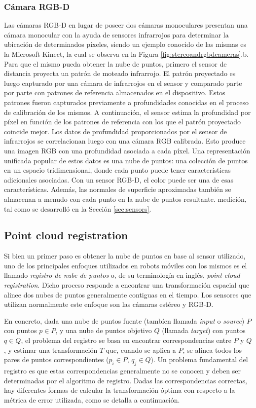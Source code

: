 \subsubsection{Cámara RGB-D}
Las cámaras RGB-D\cite{hogman2011} en lugar de poseer dos cámaras monoculares presentan una cámara monocular con la ayuda de sensores infrarrojos para determinar la ubicación de determinados píxeles, siendo un ejemplo conocido de las mismas es la Microsoft Kinect, la cual se observa en la Figura \ref{fig:stereoandrgbdcameras}.b. Para que el mismo pueda obtener la nube de puntos, primero el sensor de distancia proyecta un patrón de moteado infrarrojo. El patrón proyectado es luego capturado por una cámara de infrarrojos en el sensor y comparado parte por parte con patrones de referencia almacenados en el dispositivo. Estos patrones fueron capturados previamente a profundidades conocidas en el proceso de calibración de los mismos. A continuación, el sensor estima la profundidad por píxel en función de los patrones de referencia con los que el patrón proyectado coincide mejor. Los datos de profundidad proporcionados por el sensor de infrarrojos se correlacionan luego con una cámara RGB calibrada. Esto produce una imagen RGB con una profundidad asociada a cada píxel. Una representación unificada popular de estos datos es una nube de puntos: una colección de puntos en un espacio tridimensional, donde cada punto puede tener características adicionales asociadas. Con un sensor RGB-D, el color puede ser una de esas características. Además, las normales de superficie aproximadas también se almacenan a menudo con cada punto en la nube de puntos resultante.
\else
medición, tal como se desarrolló en la Sección \ref{sec:sensors}.
\fi
\subsection{Point cloud registration}
Si bien un primer paso es obtener la nube de puntos en base al sensor utilizado, uno de los principales enfoques utilizados en robots móviles con los mismos es el llamado \textit{registro de nube de puntos} o, de su terminología en inglés, \textit{point cloud registration}. Dicho proceso responde a encontrar una transformación espacial que alinee dos nubes de puntos generalmente contiguas en el tiempo. Los sensores que utilizan normalmente este enfoque son las cámaras estéreo y RGB-D.

En concreto, dada una nube de puntos fuente (tambíen llamada \textit{input} o \textit{source}) $P$ con puntos $p \in P$, y una nube de puntos objetivo $Q$ (llamada \textit{target}) con puntos $q \in Q$, el problema del registro se basa en encontrar correspondencias entre $P$ y $Q$, y estimar una transformación $T$ que, cuando se aplica a $P$, se alinea todos los pares de puntos correspondientes ($p_i \in P$, $q_j \in Q$). Un problema fundamental del registro es que estas correspondencias generalmente no se conocen y deben ser determinadas por el algoritmo de registro. Dadas las correspondencias correctas, hay diferentes formas de calcular la transformación óptima con respecto a la métrica de error utilizada, como se detalla a continuación.

